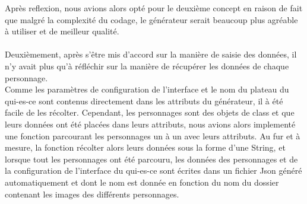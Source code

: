 \documentclass[a4paper]{article}
\begin{document}
Après reflexion, nous avions alors opté pour le deuxième concept en raison de fait que malgré la complexité du codage, le générateur serait beaucoup plus agréable à utiliser et de meilleur qualité.\\  \\

Deuxièmement, après s'être mis d'accord sur la manière de saisie des données, il n'y avait plus qu'à réfléchir 
sur la manière de récupérer les données de chaque personnage.\\
Comme les paramètres de configuration de l'interface et le nom du plateau du qui-es-ce sont contenus directement dans les attributs du générateur, il à été facile de les récolter. 
Cependant, les personnages sont des objets de class et que leurs données ont été placées dans leurs attributs, nous avions alors implementé une fonction parcourant les personnages un à un avec leurs attributs. Au fur et à mesure, la fonction 
récolter alors leurs données sous la forme d'une String, et lorsque tout les personnages ont été parcouru,
les données des personnages et de la configuration de l'interface du qui-es-ce sont écrites dans un fichier Json généré automatiquement et dont le nom est donnée en fonction du nom du dossier contenant les images des différents personnages.
\end{document}

